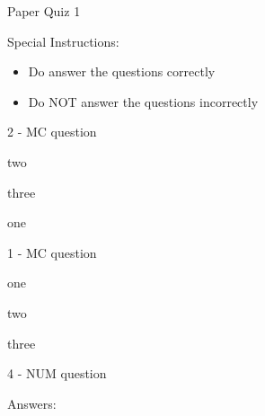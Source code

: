 \documentclass[letterpaper,10pt]{article}
\begin{document}
\begin{center}
{\Large Paper Quiz 1}
\end{center}

Special Instructions:
\begin{itemize}
    \item Do answer the questions correctly
    \item Do NOT answer the questions incorrectly
\end{itemize}
\vspace{10pt}

\begin{compactenum}
    \begin{minipage}{\linewidth}
    \item 2 - MC question
    \begin{compactenum}
        \item two
        \item three
        \item one
    \end{compactenum}
    \end{minipage}

    \vspace{10pt}

    \begin{minipage}{\linewidth}
    \item 1 - MC question
    \begin{compactenum}
        \item one
        \item two
        \item three
    \end{compactenum}
    \end{minipage}

    \vspace{10pt}

    \begin{minipage}{\linewidth}
    \item 4 - NUM question
    \end{minipage}

    \vspace{10pt}

\end{compactenum}

\clearpage
Answers:
\end{document}
